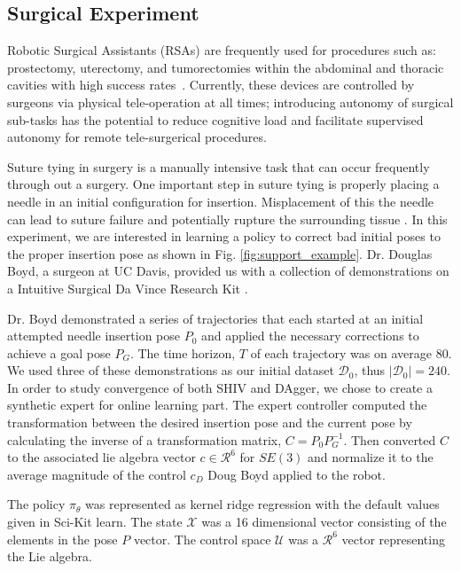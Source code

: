 \documentclass[10pt, conference]{ieeeconf}      %
\begin{document}
\subsection{Surgical Experiment}
Robotic Surgical Assistants (RSAs) are frequently used for procedures such as: prostectomy, uterectomy, and tumorectomies within the abdominal and thoracic cavities with high success rates~\cite{van2013laparoscopic,darzi2004impact}. Currently, these devices are controlled by surgeons via physical tele-operation at all times; introducing autonomy of surgical sub-tasks has the potential to reduce cognitive load and facilitate supervised autonomy for remote tele-surgerical procedures.

Suture tying in surgery is a manually intensive task that can occur frequently through out a surgery. One important step
in suture tying is properly placing a needle in an initial configuration for insertion. Misplacement of this the needle
can lead to suture failure and potentially rupture the surrounding tissue \cite{liu2015optimal}. In this experiment, we
are interested in learning a policy to correct bad initial poses to the proper insertion pose as shown in Fig.
\ref{fig:support_example}. Dr. Douglas Boyd, a surgeon at UC Davis, provided us with a collection of demonstrations on a Intuitive Surgical Da Vince Research Kit \cite{AnnualReport2014}.

Dr. Boyd demonstrated a series of trajectories that each started at an initial attempted needle insertion pose $P_0$ and
applied the necessary corrections to achieve a goal pose $P_G$. The time horizon, $T$ of each trajectory was on average 80.  We used three of these demonstrations as our initial
dataset $\mathcal{D}_0$, thus $|\mathcal{D}_0| = 240$. In order to study convergence of both SHIV and DAgger, we chose to create a synthetic expert for online learning part. The expert controller computed the transformation between the desired insertion pose and the current pose  by calculating the inverse of a transformation matrix, $C = P_0P_G^{-1}$. Then converted $C$ to the associated lie algebra vector $c \in \mathcal{R}^6$ for $SE(3)$ and normalize it to the average magnitude of the control $c_D$ Doug Boyd applied to the robot. 

The policy $\pi_{\theta}$ was represented as kernel ridge regression with the default values given in Sci-Kit learn. The state $\mathcal{X}$ was  a 16 dimensional vector consisting of the elements in the pose $P$ vector. The control space $\mathcal{U}$ was a $\mathcal{R}^6$ vector representing the Lie algebra. 
\end{document}
